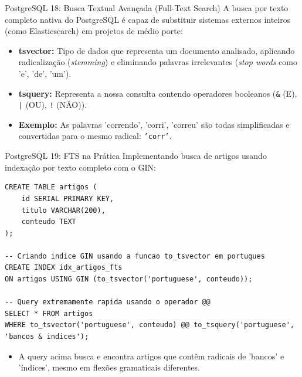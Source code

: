 \documentclass[9pt]{beamer}
\begin{document}
\begin{frame}{PostgreSQL 18: Busca Textual Avançada (Full-Text Search)}
    A busca por texto completo nativa do PostgreSQL é capaz de substituir sistemas externos inteiros (como Elasticsearch) em projetos de médio porte:
    
    \vspace{0.3cm}
    \begin{itemize}
        \item \textbf{tsvector:} Tipo de dados que representa um documento analisado, aplicando radicalização (\textit{stemming}) e eliminando palavras irrelevantes (\textit{stop words} como 'e', 'de', 'um').
        \item \textbf{tsquery:} Representa a nossa consulta contendo operadores booleanos (\texttt{\&} (E), \texttt{|} (OU), \texttt{!} (NÃO)).
        \item \textbf{Exemplo:} As palavras 'correndo', 'corri', 'correu' são todas simplificadas e convertidas para o mesmo radical: \texttt{'corr'}.
    \end{itemize}
\end{frame}

\begin{frame}[fragile]{PostgreSQL 19: FTS na Prática}
    Implementando busca de artigos usando indexação por texto completo com o GIN:
    
    \vspace{0.2cm}
    \begin{lstlisting}[basicstyle=\ttfamily\scriptsize]
CREATE TABLE artigos (
    id SERIAL PRIMARY KEY,
    titulo VARCHAR(200),
    conteudo TEXT
);

-- Criando indice GIN usando a funcao to_tsvector em portugues
CREATE INDEX idx_artigos_fts 
ON artigos USING GIN (to_tsvector('portuguese', conteudo));

-- Query extremamente rapida usando o operador @@
SELECT * FROM artigos 
WHERE to_tsvector('portuguese', conteudo) @@ to_tsquery('portuguese', 'bancos & indices');
    \end{lstlisting}
    
    \vspace{0.1cm}
    \begin{itemize}
        \item A query acima busca e encontra artigos que contêm radicais de 'bancos' e 'índices', mesmo em flexões gramaticais diferentes.
    \end{itemize}
\end{frame}
\end{document}
